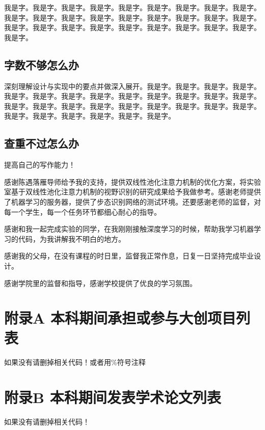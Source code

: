 \documentclass[supercite]{HustGraduPaper}
\theoremstyle{definition}
\begin{document}
我是字。我是字。我是字。我是字。我是字。我是字。我是字。我是字。我是字。我是字。我是字。我是字。我是字。我是字。我是字。我是字。我是字。我是字。我是字。我是字。我是字。我是字。我是字。我是字。我是字。我是字。我是字。我是字。

\subsection{字数不够怎么办}

深刻理解设计与实现中的要点并做深入展开。我是字。我是字。我是字。我是字。我是字。我是字。我是字。我是字。我是字。我是字。我是字。我是字。我是字。我是字。我是字。我是字。我是字。我是字。我是字。我是字。我是字。我是字。我是字。我是字。我是字。我是字。我是字。我是字。

\subsection{查重不过怎么办}

提高自己的写作能力！

\newpage

\begin{thankpage}

感谢陈遇落雁导师给予我的支持，提供双线性池化注意力机制的优化方案，将实验室基于双线性池化注意力机制的视野识别的研究成果给予我做参考。感谢老师提供了机器学习的服务器，提供了步态识别网络的测试环境。还要感谢老师的监督，对每一个学生，每一个任务环节都细心耐心的指导。

感谢和我一起完成实验的同学，在我刚刚接触深度学习的时候，帮助我学习机器学习的代码，为我讲解我不明白的地方。

感谢我的父母，在没有课程的时日里，监督我正常作息，日复一日坚持完成毕业设计。

感谢学院里的监督和指导，感谢学校提供了优良的学习氛围。


\end{thankpage}

\nocite{*} %




\setcounter{secnumdepth}{0}
\appendix

\section{附录A 本科期间承担或参与大创项目列表}

如果没有请删掉相关代码！或者用\%符号注释

\newpage
\section{附录B 本科期间发表学术论文列表}

如果没有请删掉相关代码！
\end{document}
